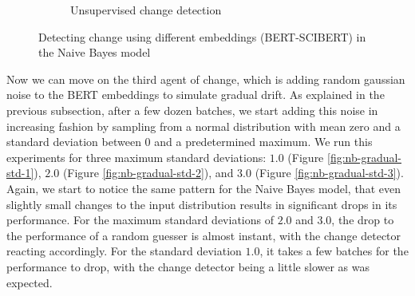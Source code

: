 \documentclass[12pt]{extreport}
\begin{document}
\begin{figure}[H]
\begin{subfigure}{.5\textwidth}
  \caption{Unsupervised change detection}
  \label{fig:nb-diff-embed-unsuper-B-S}
\end{subfigure}
\caption{Detecting change using different embeddings (BERT-SCIBERT) in the Naive Bayes model}
\label{fig:nb-diff-embed-B-S}
\end{figure}

Now we can move on the third agent of change, which is adding random gaussian noise to the BERT embeddings to simulate gradual drift. As explained in the previous subsection, after a few dozen batches, we start adding this noise in increasing fashion by sampling from a normal distribution with mean zero and a standard deviation between 0 and a predetermined maximum. We run this experiments for three maximum standard deviations: $1.0$ (Figure \ref{fig:nb-gradual-std-1}), $2.0$ (Figure \ref{fig:nb-gradual-std-2}), and $3.0$ (Figure \ref{fig:nb-gradual-std-3}). Again, we start to notice the same pattern for the Naive Bayes model, that even slightly small changes to the input distribution results in significant drops in its performance. For the maximum standard deviations of $2.0$ and $3.0$, the drop to the performance of a random guesser is almost instant, with the change detector reacting accordingly. For the standard deviation $1.0$, it takes a few batches for the performance to drop, with the change detector being a little slower as was expected.
\end{document}
